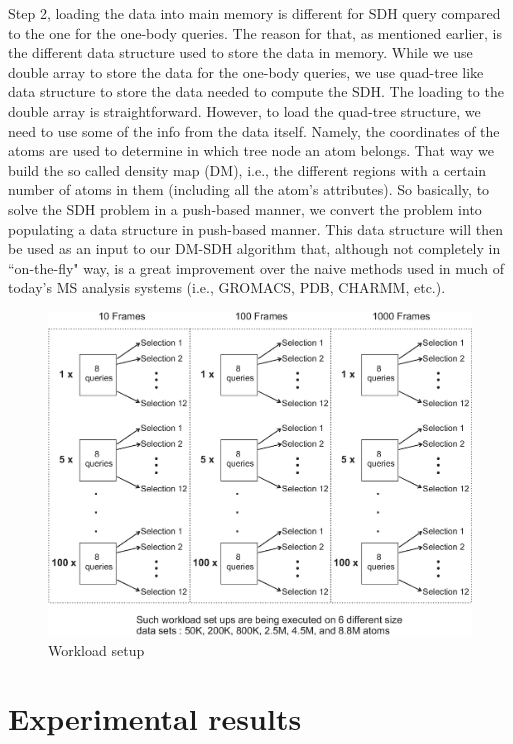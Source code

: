\documentclass[10pt,journal,final,letterpaper,twocolumn]{IEEEtran}
\begin{document}
Step 2, loading the data into main memory is different for SDH query
compared to the one for the one-body queries. The reason for that,
as mentioned earlier, is the different data structure used to store
the data in memory. While we use double array to store the data for
the one-body queries, we use quad-tree like data structure to store
the data needed to compute the SDH. The loading to the double array
is straightforward. However, to load the quad-tree structure, we
need to use some of the info from the data itself. Namely, the
coordinates of the atoms are used to determine in which tree node an
atom belongs. That way we build the so called density map (DM),
i.e., the different regions with a certain number of atoms in them
(including all the atom's attributes). So basically, to solve the
SDH problem in a push-based manner, we convert the problem into
populating a data structure in push-based manner. This data
structure will then be used as an input to our DM-SDH algorithm
that, although not completely in ``on-the-fly" way, is a great
improvement over the naive methods used in much of today's MS
analysis systems (i.e., GROMACS, PDB, CHARMM, etc.).


\begin{figure}
 \centerline{ \includegraphics[width=.99\columnwidth]{images/workload_set_up1.eps} }
 \caption{Workload setup}
 \label{fg:workload_set_up}
\end{figure}

\section{Experimental results}\label{sc:experiments}
\end{document}
